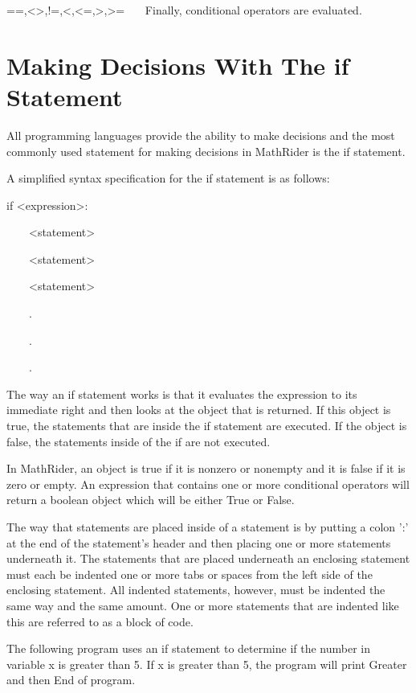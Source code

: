 \documentclass[12pt,oneside]{book}
\begin{document}
==,{\textless}{\textgreater},!=,{\textless},{\textless}=,{\textgreater},{\textgreater}=
\ \ \ Finally, conditional operators are evaluated.

\section[Making Decisions With The if Statement]{Making Decisions With The if Statement}

All programming languages provide the ability to make decisions and the most commonly used statement for making decisions in MathRider is the if statement. 

A simplified syntax specification for the if statement is as follows:


if {\textless}expression{\textgreater}:

\ \ \ \ {\textless}statement{\textgreater}

\ \ \ \ {\textless}statement{\textgreater}

\ \ \ \ {\textless}statement{\textgreater}

\ \ \ \ .

\ \ \ \ .

\ \ \ \ .


The way an if statement works is that it evaluates the expression to its immediate right and then looks at the object that is returned. If this object is {\textquotedbl}true{\textquotedbl}, the statements that are inside the if statement are executed. If the object is {\textquotedbl}false{\textquotedbl}, the statements inside of the if are not executed. 

In MathRider, an object is {\textquotedbl}true{\textquotedbl} if it is nonzero or nonempty and it is {\textquotedbl}false{\textquotedbl} if it is zero or empty. An expression that contains one or more conditional operators will return a boolean object which will be either True or False. 

The way that statements are placed inside of a statement is by putting a colon ':' at the end of the statement's header and then placing one or more statements underneath it. The statements that are placed underneath an enclosing statement must each be indented one or more tabs or spaces from the left side of the enclosing statement. All indented statements, however, must be indented the same way and the same amount. One or more statements that are indented like this are referred to as a block of code. 

The following program uses an if statement to determine if the number in variable x is greater than 5. If x is greater than 5, the program will print {\textquotedbl}Greater{\textquotedbl} and then {\textquotedbl}End of program{\textquotedbl}. 
\end{document}
